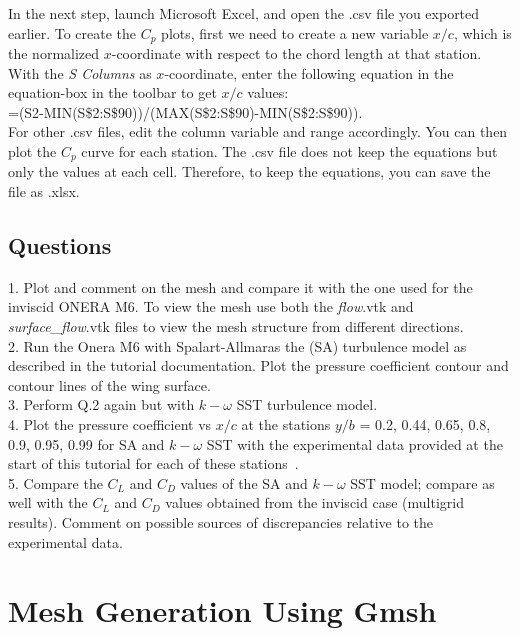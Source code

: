 In the next step, launch Microsoft Excel, and open the .csv file you exported earlier. To create the $C_p$ plots, first we need to create a new
variable $x/c$, which is the normalized $x$-coordinate with respect to the chord length at that station. With the \textit{S Columns} as $x$-coordinate, enter the following equation in the equation-box in the toolbar to get $x/c$ values: \\
=(S2-MIN(S\$2:S\$90))/(MAX(S\$2:S\$90)-MIN(S\$2:S\$90)). \\
For other .csv files, edit the column variable and range accordingly. You can then plot the $C_p$ curve for each station. The .csv file does not keep the equations but only the values at each cell. Therefore, to keep the equations, you can save the file as .xlsx.
\fi
\clearpage
\section{Questions}
1. Plot and comment on the mesh and compare it with the one used for the inviscid ONERA M6. To view the mesh use both the \textit{flow}.vtk and \textit{surface\_flow}.vtk files to view the mesh structure from different directions. \\
2. Run the Onera M6 with Spalart-Allmaras the (SA) turbulence model as described in the tutorial documentation. Plot the pressure coefficient contour and contour lines of the wing surface. \\
3. Perform Q.2 again but with $k-\omega$ SST turbulence model. \\
4. Plot the pressure coefficient vs $x/c$ at the stations $y/b$ = 0.2, 0.44, 0.65, 0.8, 0.9, 0.95, 0.99 for SA and $k-\omega$ SST with the experimental data provided at the start of this tutorial for each of these stations~\cite{schmitt1979pressure}. \\
5. Compare the $C_L$ and $C_D$ values of the SA and $k-\omega$ SST model; compare as well with the $C_L$ and $C_D$ values obtained from the inviscid case (multigrid results). Comment on possible sources of discrepancies relative to the experimental data.
\chapter{Mesh Generation Using Gmsh}
\label{ch:Mesh Generation Unisg Gmsh}
